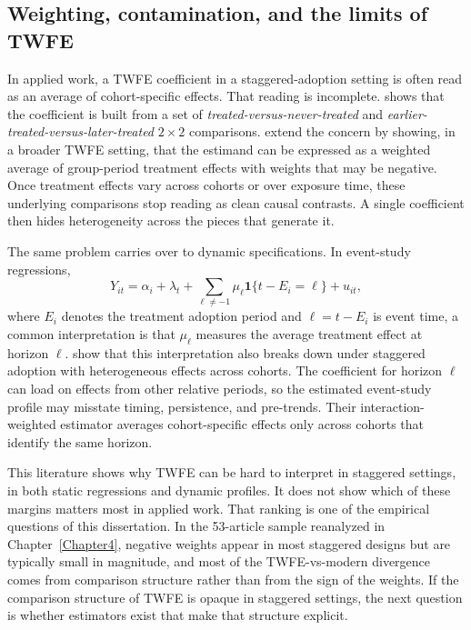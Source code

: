 \subsection{Weighting, contamination, and the limits of TWFE}

In applied work, a TWFE coefficient in a staggered-adoption setting is often read as an average of cohort-specific effects. That reading is incomplete. \textcite{goodman2021difference} shows that the coefficient is built from a set of \textit{treated-versus-never-treated} and \textit{earlier-treated-versus-later-treated} \(2\times 2\) comparisons. \textcite{dechaisemartin2020twfe} extend the concern by showing, in a broader TWFE setting, that the estimand can be expressed as a weighted average of group-period treatment effects with weights that may be negative. Once treatment effects vary across cohorts or over exposure time, these underlying comparisons stop reading as clean causal contrasts. A single coefficient then hides heterogeneity across the pieces that generate it.

The same problem carries over to dynamic specifications. In event-study regressions,
\begin{equation}
Y_{it}
=
\alpha_i + \lambda_t
+ \sum_{\ell \neq -1} \mu_{\ell}\mathbf{1}\{t-E_i=\ell\}
+ u_{it},
\label{eq:twfe_event_study_short}
\end{equation}
where \(E_i\) denotes the treatment adoption period and \(\ell=t-E_i\) is event time, a common interpretation is that \(\mu_\ell\) measures the average treatment effect at horizon \(\ell\). \textcite{sun2021estimating} show that this interpretation also breaks down under staggered adoption with heterogeneous effects across cohorts. The coefficient for horizon \(\ell\) can load on effects from other relative periods, so the estimated event-study profile may misstate timing, persistence, and pre-trends. Their interaction-weighted estimator averages cohort-specific effects only across cohorts that identify the same horizon.

This literature shows why TWFE can be hard to interpret in staggered settings, in both static regressions and dynamic profiles. It does not show which of these margins matters most in applied work. That ranking is one of the empirical questions of this dissertation. In the 53-article sample reanalyzed in Chapter~\ref{Chapter4}, negative weights appear in most staggered designs but are typically small in magnitude, and most of the TWFE-vs-modern divergence comes from comparison structure rather than from the sign of the weights. If the comparison structure of TWFE is opaque in staggered settings, the next question is whether estimators exist that make that structure explicit.


